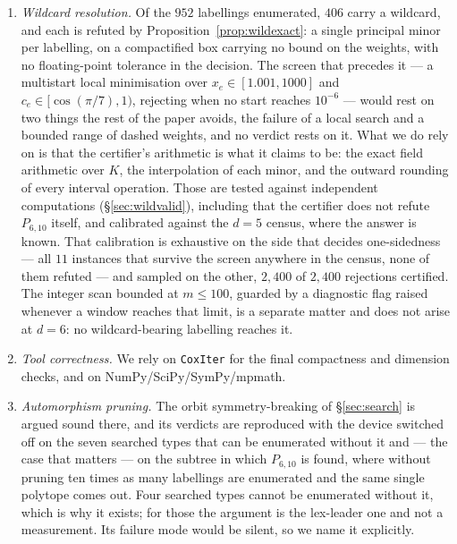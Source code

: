 \documentclass[11pt,reqno]{amsart}
\theoremstyle{plain}
\theoremstyle{definition}
\newcommand{\PP}{P_{6,10}}
\newcommand{\DFiveWildCert}{2{,}400}
\newcommand{\DFiveWildScreenPass}{11}
\newcommand{\DFiveWildJointKilled}{2{,}400}
\newcommand{\NumWild}{406}
\newcommand{\NumAssignments}{952}
\begin{document}
\begin{enumerate}
  \item\label{as:wild} \emph{Wildcard resolution.} Of the $\NumAssignments$
  labellings enumerated, $\NumWild$ carry a wildcard, and each is refuted by
  Proposition~\ref{prop:wildexact}: a single principal minor per labelling, on a
  compactified box carrying no bound on the weights, with no floating-point
  tolerance in the decision. The screen that precedes it --- a multistart local
  minimisation over $x_e\in[1.001,1000]$ and $c_e\in[\cos(\pi/7),1)$, rejecting
  when no start reaches $10^{-6}$ --- would rest on two things the rest of the
  paper avoids, the failure of a local search and a bounded range of dashed
  weights, and no verdict rests on it. What we do rely on is that the
  certifier's arithmetic is what it claims to be: the exact field arithmetic over
  $K$, the interpolation of each minor, and the outward rounding of every
  interval operation. Those are tested against independent computations
  (\S\ref{sec:wildvalid}), including that the certifier does not refute $\PP$
  itself, and calibrated against the $d=5$ census, where the answer is known. That
  calibration is exhaustive on the side that decides one-sidedness --- all
  $\DFiveWildScreenPass$ instances that survive the screen anywhere in the census,
  none of them refuted --- and sampled on the other, $\DFiveWildCert$ of
  $\DFiveWildJointKilled$ rejections certified.
  The integer scan bounded at $m\le100$, guarded by a
  diagnostic flag raised whenever a window reaches that limit, is a separate matter
  and does not arise at $d=6$: no wildcard-bearing labelling reaches it.

\item\label{as:tools} \emph{Tool correctness.} We rely on \texttt{CoxIter} for
  the final compactness and dimension checks, and on NumPy/SciPy/SymPy/mpmath.

\item\label{as:aut} \emph{Automorphism pruning.} The orbit symmetry-breaking of
  \S\ref{sec:search} is argued sound there, and its verdicts are reproduced with
  the device switched off on the seven searched types that can be enumerated
  without it and --- the case that matters --- on the subtree in which $\PP$ is
  found, where without pruning ten times as many labellings are enumerated and the
  same single polytope comes out. Four searched types cannot be enumerated without
  it, which is why it exists; for those the argument is the lex-leader one and not
  a measurement. Its failure mode would be silent, so we name it explicitly.

\end{enumerate}
\end{document}

